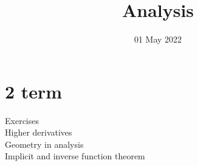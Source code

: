 
\title{Analysis}
\author{}
\date{01 May 2022}

\maketitle
\section{2 term}
\begin{description}
    \item[Exercises] 
    \item[Higher derivatives] 
    \item[Geometry in analysis]  
    \item[Implicit and inverse function theorem] 
\end{description}
